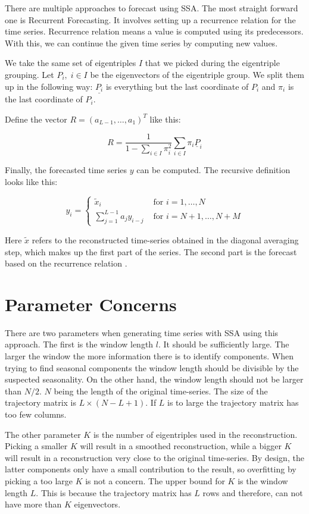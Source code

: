 There are multiple approaches to forecast using SSA. The most straight forward one is Recurrent Forecasting. It involves setting up a recurrence relation for the time series. Recurrence relation means a value is computed using its predecessors. With this, we can continue the given time series by computing new values. 

We take the same set of eigentriples $I$ that we picked during the eigentriple grouping. Let $P_i, \; i \in I$ be the eigenvectors of the eigentriple group. We split them up in the following way: $\underline{P_i}$ is everything but the last coordinate of $P_i$ and $\pi_i$ is the last coordinate of $P_i$. 

Define the vector $R = (a_{L-1}, \dots, a_1)^T$ like this:

\begin{equation}
   R=\frac{1}{1-\sum_{i \in I} \pi_{i}^{2}} \sum_{i \in I} \pi_{i} \underline{P}_{i}
   \label{eq:r-def}
\end{equation}

Finally, the forecasted time series $y$ can be computed. The recursive definition looks like this:

\begin{equation}
  y_{i}=\left\{\begin{array}{ll}
\widetilde{x}_{i} & \text { for } i=1, \ldots, N \\
\sum_{j=1}^{L-1} a_{j} y_{i-j} & \text { for } i=N+1, \ldots, N+M
\end{array}\right. 
\end{equation}

\newpage

Here $\tilde{x}$ refers to the reconstructed time-series obtained in the diagonal averaging step, which makes up the first part of the series. The second part is the forecast based on the recurrence relation \parencite{golyandina2014basic}.

\section{Parameter Concerns}

There are two parameters when generating time series with SSA using this approach. The first is the window length $l$. It should be sufficiently large. The larger the window the more information there is to identify components. When trying to find seasonal components the window length should be divisible by the suspected seasonality. On the other hand, the window length should not be larger than $N/2$. $N$ being the length of the original time-series. The size of the trajectory matrix is $L \times (N-L+1)$. If $L$ is to large the trajectory matrix has too few columns. 

The other parameter $K$ is the number of eigentriples used in the reconstruction. Picking a smaller $K$ will result in a smoothed reconstruction, while a bigger $K$ will result in a reconstruction very close to the original time-series. By design, the latter components only have a small contribution to the result, so overfitting by picking a too large $K$ is not a concern. The upper bound for $K$ is the window length $L$. This is because the trajectory matrix has $L$ rows and therefore, can not have more than $K$ eigenvectors. 